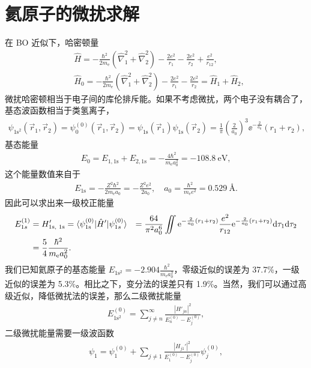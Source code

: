 \section{氦原子的微扰求解}
在 BO 近似下，哈密顿量
\begin{align}
    &\hat H = -\frac{\hbar^2}{2m_{\mathrm e}} \left(\hat\nabla_1^2 + \hat \nabla_2^2\right) - \frac{2e^2}{r_1} - \frac{2e^2}{r_2} + \frac{e^2}{r_{12}}, \\
    &\hat H_0 = -\frac{\hbar^2}{2m_{\mathrm e}} \left(\hat\nabla_1^2 + \hat \nabla_2^2\right) - \frac{2e^2}{r_1} - \frac{2e^2}{r_2} = \hat H_1 + \hat H_2, 
\end{align}
微扰哈密顿相当于电子间的库伦排斥能。如果不考虑微扰，两个电子没有耦合了，基态波函数相当于类氢离子，
\begin{align}
    \psi_{\text{1s}^2}(\vec r_1, \vec r_2) = \psi_0^{(0)} (\vec r_1, \vec r_2) = \psi_{\text{1s}}(\vec r_1) \psi_{\text{1s}}(\vec r_2) = \frac{1}{\pi} \left(\frac2{a_0}\right)^3 \ee^{-\frac2{a_0}}(r_1 + r_2), 
\end{align}
基态能量
\begin{align}
    E_0 = E_{1,\text{1s}} + E_{2, \text{1s}} = -\frac{4\hbar^2}{m_{\mathrm e}a_0^2} = \SI{-108.8}{\electronvolt}, 
\end{align}
这个能量数值来自于
\begin{align}
    E_{\text{1s}} = - \frac{Z^2\hbar^2}{2m_{\mathrm{e}}a_0} = - \frac{Z^2e^2}{2a_0}, \quad a_0= \frac{\hbar^2}{m_\mathrm{e}e^2} = \SI{0.529}{\angstrom}. 
\end{align}
因此可以求出来一级校正能量
\begin{align}
    E_{1s}^{(1)} &= H'_{\text{1s, 1s}} = \langle \psi_{\mathrm{1s}}^{(0)} | \hat H' | \psi_{1s}^{(0)} \rangle 
    &= \frac{64}{\pi^2a_0^6} \iint \mathrm{e}^{-\frac2{a_0}(r_1 + r_2)} \frac{e^2}{r_{12}} \mathrm{e}^{-\frac2{a_0}(r_1+r_2)}\mathrm{d}\tau_1 \mathrm{d}\tau_2 \notag \\
    &= \frac54 \frac{\hbar^2}{m_\mathrm{e}a_0^2}. 
\end{align}
我们已知氦原子的基态能量 $E_{\mathrm{1s^2}} = -2.904\frac{\hbar^2}{m_{\mathrm e}a_0^2}$，零级近似的误差为 37.7\%，一级近似的误差为 5.3\%。相比之下，变分法的误差只有 1.9\%。当然，我们可以通过高级近似，降低微扰法的误差，那么二级微扰能量
\begin{align}
    E_{\mathrm{1s^2}}^{(0)} = \sum_{j\neq n}^{\infty} \frac{|H'_{jn}|^2}{E_n^{(0)} - E_j^{(0)}}, 
\end{align}
二级微扰能量需要一级波函数
\begin{align}
    \psi_1 = \psi_1^{(0)} + \sum_{j\neq1}\frac{|H_{j1}'|^2}{E_1^{(0)} - E_j^{(0)}} \psi_j^{(0)}, 
\end{align}
